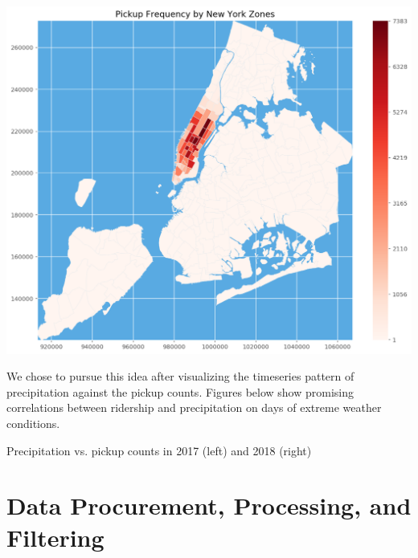 \documentclass[journal, 12pt]{IEEEtran}
\begin{document}
\begingroup
    \centering
    \includegraphics[width=0.45\columnwidth]{images/heatmap.png}
    \label{fig:heatmap}
    \medskip
\endgroup

\noindent We chose to pursue this idea after visualizing the timeseries pattern of precipitation against the pickup counts. Figures below show promising correlations between ridership and precipitation on days of extreme weather conditions.


\begingroup
    \centering
    \medskip
    \qquad
    \caption{Precipitation vs. pickup counts in 2017 (left) and 2018 (right)}%
    \label{fig:curves}%
    \medskip
\endgroup


\section{Data Procurement, Processing, and Filtering}
\end{document}
